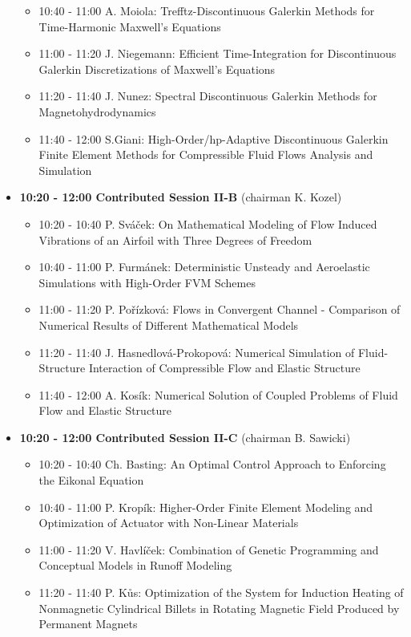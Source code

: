 \documentclass[10pt, A4]{article}%
\begin{document}
\begin{itemize}
\begin{itemize}
    \item 10:40 - 11:00 A. Moiola: Trefftz-Discontinuous Galerkin Methods for Time-Harmonic Maxwell’s Equations
    \item 11:00 - 11:20 J. Niegemann: Efficient Time-Integration for Discontinuous Galerkin Discretizations of Maxwell's Equations
    \item 11:20 - 11:40 J. Nunez: Spectral Discontinuous Galerkin Methods for Magnetohydrodynamics
    \item 11:40 - 12:00 S.Giani: High-Order/hp-Adaptive Discontinuous Galerkin Finite Element Methods for Compressible Fluid Flows
Analysis and Simulation
  \end{itemize}
  \item {\bf 10:20 - 12:00 Contributed Session II-B} (chairman K. Kozel) 
  \begin{itemize}
    \item 10:20 - 10:40 P. Sv\'{a}\v{c}ek: On Mathematical Modeling of Flow Induced Vibrations of an Airfoil with Three Degrees of Freedom
    \item 10:40 - 11:00 P. Furm\'{a}nek: Deterministic Unsteady and Aeroelastic Simulations with High-Order FVM Schemes
    \item 11:00 - 11:20 P. Po\v{r}\'{i}zkov\'{a}: Flows in Convergent Channel - Comparison of Numerical Results of Different Mathematical Models
    \item 11:20 - 11:40 J. Hasnedlov\'{a}-Prokopov\'{a}: Numerical Simulation of Fluid-Structure Interaction of Compressible Flow and Elastic Structure
    \item 11:40 - 12:00 A. Kos\'{i}k: Numerical Solution of Coupled Problems of Fluid Flow and Elastic Structure   
  \end{itemize}
    \item {\bf 10:20 - 12:00 Contributed Session II-C} (chairman B. Sawicki) 
  \begin{itemize}
    \item 10:20 - 10:40 Ch. Basting: An Optimal Control Approach to Enforcing the Eikonal Equation
    \item 10:40 - 11:00 P. Krop\'{i}k: Higher-Order Finite Element Modeling and Optimization of Actuator with Non-Linear Materials
    \item 11:00 - 11:20 V. Havl\'{i}\v{c}ek: Combination of Genetic Programming and Conceptual Models in Runoff Modeling
    \item 11:20 - 11:40 P. K\r{u}s: Optimization of the System for Induction Heating of Nonmagnetic Cylindrical Billets in Rotating Magnetic Field Produced by Permanent Magnets

\end{itemize}
\end{itemize}
\end{document}
